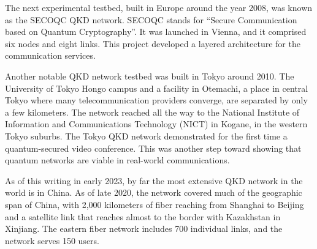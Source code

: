 The next experimental testbed, built in Europe around the year 2008, was known as the SECOQC QKD network.
SECOQC stands for ``Secure Communication based on Quantum Cryptography''.
It was launched in Vienna, and it comprised six nodes and eight links. This project developed a layered architecture for the communication services.

Another notable QKD network testbed was built in Tokyo around 2010.
The University of Tokyo Hongo campus and a facility in Otemachi, a place in central Tokyo where many telecommunication providers converge, are separated by only a few kilometers.
The network reached all the way to the National Institute of Information and Communications Technology (NICT) in Kogane, in the western Tokyo suburbs.
The Tokyo QKD network demonstrated for the first time a quantum-secured video conference.
This was another step toward showing that quantum networks are viable in real-world communications.

As of this writing in early 2023, by far the most extensive QKD network in the world is in China.
As of late 2020, the network covered much of the geographic span of China, with 2,000 kilometers of fiber reaching from Shanghai to Beijing and a satellite link that reaches almost to the border with Kazakhstan in Xinjiang.
The eastern fiber network includes 700 individual links, and the network serves 150 users.



